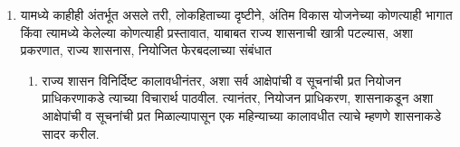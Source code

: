 \documentclass[12pt]{article}
\begin{document}
{\begin{enumerate}
\begin{enumerate}
    \item यामध्ये काहीही अंतर्भूत असले तरी, लोकहिताच्या दृष्टीने, अंतिम विकास
      योजनेच्या कोण\-त्याही भागात किंवा त्यामध्ये केलेल्या कोणत्याही प्रस्तावात,
      याबाबत राज्य शासनाची खात्री पटल्यास, अशा प्रकरणात, राज्य शासनास,
      नियोजित फेरबदलाच्या संबंधात
      \begin{enumerate}
      \item राज्य शासन विनिर्दिष्ट कालावधीनंतर, अशा सर्व आक्षेपांची व सूचनांची
        प्रत नियो\-जन प्राधिकरणाकडे त्याच्या विचारार्थ पाठवील. त्यानंतर, नियोजन
        प्राधिकरण, शासना\-कडून अशा आक्षेपांची व सूचनांची प्रत मिळाल्यापासून एक
        महिन्याच्या काला\-वधीत त्याचे म्हणणे शासनाकडे सादर करील.
\end{enumerate}

      
\end{enumerate}

\end{enumerate}

}





\end{document}
